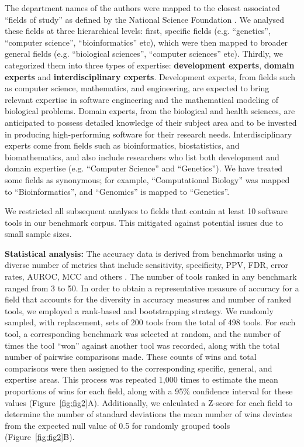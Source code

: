 \documentclass[fleqn,10pt,doc,onecolumn]{SelfArx}%
\begin{document}
The department names of the authors were mapped to the closest
associated ``fields of study'' as defined by the National Science
Foundation \cite{fields2014}. We analysed these fields at three
hierarchical levels: first, specific fields (e.g. ``genetics'',
``computer science'', ``bioinformatics'' etc), which were then mapped
to broader general fields (e.g. ``biological sciences'', ``computer
sciences'' etc). Thirdly, we categorized them into three types of
expertise: \textbf{development experts}, \textbf{domain experts} and
\textbf{interdisciplinary experts}.  Development experts, from fields
such as computer science, mathematics, and engineering, are expected
to bring relevant expertise in software engineering and the
mathematical modeling of biological problems. Domain experts, from the
biological and health sciences, are anticipated to possess detailed
knowledge of their subject area and to be invested in producing
high-performing software for their research needs. Interdisciplinary
experts come from fields such as bioinformatics, biostatistics, and
biomathematics, and also include researchers who list both development
and domain expertise (e.g. ``Computer Science'' and ``Genetics''). We
have treated some fields as synonymous; for example, ``Computational
Biology'' was mapped to ``Bioinformatics'', and ``Genomics'' is mapped
to ``Genetics''.

We restricted all subsequent analyses to fields that contain at least 10
software tools in our benchmark corpus. This mitigated against
potential issues due to small sample sizes. 

\textbf{Statistical analysis:} The accuracy data is derived from
benchmarks using a diverse number of metrics that include sensitivity,
specificity, PPV, FDR, error rates, AUROC, MCC and others
\cite{weber2019essential}. The number of tools ranked in any benchmark
ranged from 3 to 50. In order to obtain a representative measure of
accuracy for a field that accounts for the diversity in accuracy measures and
number of ranked tools, we employed a rank-based and
bootstrapping strategy.
We randomly sampled, with replacement, sets of 200 tools from the total of 498 tools. For each tool, a corresponding benchmark was selected at random, and the number of times the tool ``won'' against another tool was recorded, along with the total number of pairwise comparisons made. These counts of wins and total comparisons were then assigned to the corresponding specific, general, and expertise areas. This process was repeated 1,000 times to estimate the mean proportions of wins for each field, along with a 95\% confidence interval for these values (Figure~\ref{fig:fig2}A).
Additionally, we calculated a Z-score for each field to determine the number of standard deviations the mean number of wins deviates from the expected null value of 0.5 for randomly grouped tools
(Figure~\ref{fig:fig2}B).
\end{document}
